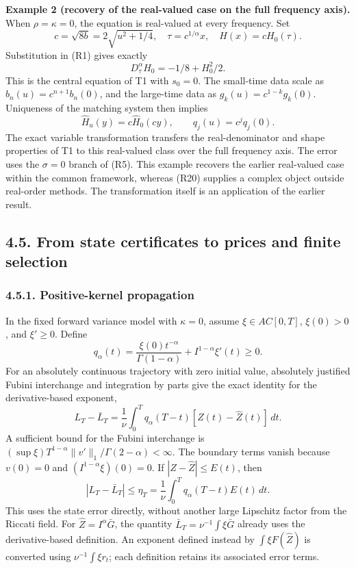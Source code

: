\documentclass[a4paper,11pt]{article}
\begin{document}
\textbf{Example 2 (recovery of the real-valued case on the full frequency axis).} When \(\rho=\kappa=0\), the equation is real-valued at every frequency. Set
\[
c=\sqrt{8b}=2\sqrt{u^2+1/4},\quad
\tau=c^{1/\alpha}x,\quad H(x)=cH_0(\tau).
\]
Substitution in (R1) gives exactly
\[
D_\tau^\alpha H_0=-1/8+H_0^2/2.
\tag{R22}
\]
This is the central equation of T1 with \(s_0=0\). The small-time data scale as \(b_n(u)=c^{n+1}b_n(0)\), and the large-time data as \(g_k(u)=c^{1-k}g_k(0)\). Uniqueness of the matching system then implies
\[
\widehat H_u(y)=c\widehat H_0(cy),\qquad q_j(u)=c^jq_j(0).
\tag{R23}
\]
The exact variable transformation transfers the real-denominator and shape properties of T1 to this real-valued class over the full frequency axis. The error uses the \(\sigma=0\) branch of (R5). This example recovers the earlier real-valued case within the common framework, whereas (R20) supplies a complex object outside real-order methods. The transformation itself is an application of the earlier result.

\subsection*{4.5. From state certificates to prices and finite selection}

\subsubsection*{4.5.1. Positive-kernel propagation}

In the fixed forward variance model with \(\kappa=0\), assume \(\xi\in AC[0,T]\), \(\xi(0)>0\), and \(\xi'\ge0\). Define
\[
q_\alpha(t)=\frac{\xi(0)t^{-\alpha}}{\Gamma(1-\alpha)}
+I^{1-\alpha}\xi'(t)\ge0.
\tag{R24}
\]
For an absolutely continuous trajectory with zero initial value, absolutely justified Fubini interchange and integration by parts give the exact identity for the derivative-based exponent,
\[
L_T-\bar L_T=\frac1\nu\int_0^Tq_\alpha(T-t)
[Z(t)-\widehat Z(t)]\,dt.
\tag{R25}
\]
A sufficient bound for the Fubini interchange is
\((\sup\xi)T^{1-\alpha}\|v'\|_1/\Gamma(2-\alpha)<\infty\). The boundary terms vanish because \(v(0)=0\) and \((I^{1-\alpha}\xi)(0)=0\). If \(|Z-\widehat Z|\le E(t)\), then
\[
|L_T-\bar L_T|\le\eta_T
=\frac1\nu\int_0^Tq_\alpha(T-t)E(t)\,dt.
\tag{R26}
\]
This uses the state error directly, without another large Lipschitz factor from the Riccati field. For \(\widehat Z=I^\alpha\bar G\), the quantity \(\bar L_T=\nu^{-1}\int\xi\bar G\) already uses the derivative-based definition. An exponent defined instead by \(\int\xi F(\widehat Z)\) is converted using \(\nu^{-1}\int\xi r_t\); each definition retains its associated error terms.
\end{document}
